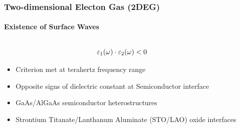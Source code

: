 \documentclass[mathserif,18pt,xcolor=table]{beamer}
\begin{document}
      \begin{frame}
        \frametitle{Two-dimensional Electon Gas (2DEG)}
        \framesubtitle{Existence of Surface Waves}
        \begin{columns} %
          \begin{column}[T]{.5\textwidth}
            \begin{equation} \nonumber
              \varepsilon_1(\omega) \cdot \varepsilon_2(\omega) < 0
              \label{eq:conditions}
            \end{equation}
            \begin{itemize}
              \item Criterion met at terahertz frequency range
              \item Opposite signs of dielectric constant at Semiconductor interface
              \item GaAs/AlGaAs semiconductor heterostructures
              \item Strontium Titanate/Lanthanum Aluminate (STO/LAO) oxide interfaces
            \end{itemize}
          \end{column}
          \begin{column}[T]{.5\textwidth}
            \end{column}%
          \end{columns}
        \end{frame}
\end{document}
